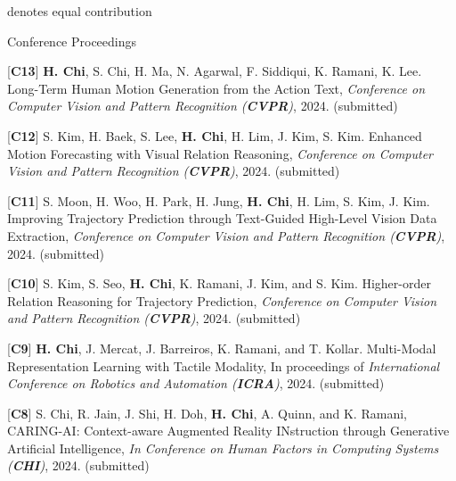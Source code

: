 

\vspace{-1em}
\begin{flushright}
{\scriptsize * denotes equal contribution}
\end{flushright}
\vspace{-1em}

\begin{cventries}
\cvpub
{Conference Proceedings} %
{ %
\begin{cvitems}
    \item {[\textbf{C13}] \textbf{H. Chi}, S. Chi, H. Ma, N. Agarwal, F. Siddiqui, K. Ramani, K. Lee. Long-Term Human Motion Generation from the Action Text, \textit{Conference on Computer Vision and Pattern Recognition (\textbf{CVPR})}, 2024. (submitted)}
    \item {[\textbf{C12}] S. Kim, H. Baek, S. Lee, \textbf{H. Chi}, H. Lim, J. Kim, S. Kim. Enhanced Motion Forecasting with Visual Relation Reasoning, \textit{Conference on Computer Vision and Pattern Recognition (\textbf{CVPR})}, 2024. (submitted)}
    \item {[\textbf{C11}] S. Moon, H. Woo, H. Park, H. Jung, \textbf{H. Chi}, H. Lim, S. Kim, J. Kim. Improving Trajectory Prediction through Text-Guided High-Level Vision Data Extraction, \textit{Conference on Computer Vision and Pattern Recognition (\textbf{CVPR})}, 2024. (submitted)}
    \item {[\textbf{C10}] S. Kim, S. Seo, \textbf{H. Chi}, K. Ramani, J. Kim, and S. Kim. Higher-order Relation Reasoning for Trajectory Prediction, \textit{Conference on Computer Vision and Pattern Recognition (\textbf{CVPR})}, 2024. (submitted)}
    \item {[\textbf{C9}] \textbf{H. Chi}, J. Mercat, J. Barreiros, K. Ramani, and T. Kollar. Multi-Modal Representation Learning with Tactile Modality, In proceedings of \textit{International Conference on Robotics and Automation (\textbf{ICRA})}, 2024. (submitted)}
    \item {[\textbf{C8}] S. Chi, R. Jain,  J. Shi,  H. Doh, \textbf{H. Chi}, A. Quinn, and K. Ramani,  CARING-AI: Context-aware Augmented Reality INstruction through Generative Artificial Intelligence, \textit{In Conference on Human Factors in Computing Systems (\textbf{CHI})}, 2024. (submitted)}

\end{cvitems}}
\end{cventries}

